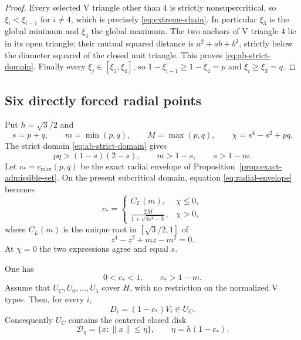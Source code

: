 \begin{proof}
Every selected V triangle other than $4$ is strictly nonsupercritical, so
$\xi_i<\xi_{i-1}$ for $i\ne4$, which is precisely
\eqref{eq:extreme-chain}.  In particular $\xi_3$ is the global minimum and
$\xi_4$ the global maximum.  The two anchors of V triangle $4$ lie in its open triangle;
their mutual squared distance is $a^2+ab+b^2$, strictly below the diameter
squared of the closed unit triangle.  This proves \eqref{eq:ab-strict-domain}.
Finally every $\xi_j\in[\xi_3,\xi_4]$, so
$1-\xi_{i-1}\ge1-\xi_4=p$ and $\xi_i\ge \xi_3=q$.
\end{proof}

\subsection{Six directly forced radial points}

Put $h=\sqrt3/2$ and
\[
 s=p+q,\qquad m=\min(p,q),\qquad M=\max(p,q),
 \qquad \chi=s^4-s^2+pq.
\]
The strict domain \eqref{eq:ab-strict-domain} gives
\begin{equation}
 pq>(1-s)(2-s),\qquad m>1-s,\qquad s>1-m.         \label{eq:pq-domain}
\end{equation}
Let $c_*=c_{\max}(p,q)$ be the exact radial envelope of
Proposition~\ref{prop:exact-admissible-set}.  On the present subcritical
domain, equation \eqref{eq:radial-envelope} becomes
\begin{equation}
 c_*=\begin{cases}
 C_L(m),&\chi\le0,\\[1mm]
 \displaystyle\frac{2M}{1+\sqrt{4s^2-3}},&\chi>0,
 \end{cases}                                    \label{eq:core-cstar}
\end{equation}
where $C_L(m)$ is the unique root in $[\sqrt3/2,1]$ of
\[
 z^4-z^2+mz-m^2=0.
\]
At $\chi=0$ the two expressions agree and equal $s$.

\begin{lemma}
\label{lem:symmetric-core-witness}
One has
\begin{equation}
 0<c_*<1,\qquad c_*>1-m.                         \label{eq:cstar-bounds}
\end{equation}
Assume that $U_C,U_0,\ldots,U_5$ cover $H$, with no restriction on the
normalized V types. Then, for every $i$,
\[
 D_i=(1-c_*)V_i\in U_C.
\]
Consequently $U_C$ contains the centered closed disk
\begin{equation}
 \mathcal D_\eta=\{x:\lVert x\rVert\le\eta\},
 \qquad \eta=h(1-c_*).                           \label{eq:forced-disk}
\end{equation}
\end{lemma}


